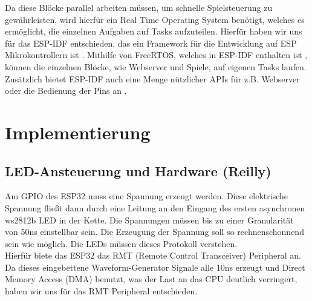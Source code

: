 \documentclass[12pt,a4paper]{article}
\begin{document}
Da diese Blöcke parallel arbeiten müssen, um schnelle Spielsteuerung zu gewährleisten, wird hierfür ein Real Time Operating System benötigt, welches es ermöglicht, die einzelnen Aufgaben auf Tasks aufzuteilen. Hierfür haben wir uns für das ESP-IDF entschieden, das ein Framework für die Entwicklung auf ESP Mikrokontrollern ist \cite{ESSPRESSIF:Reference}. Mithilfe von FreeRTOS, welches in ESP-IDF enthalten ist \cite{ESSPRESSIF:Reference}, können die einzelnen Blöcke, wie Webserver und Spiele, auf eigenen Tasks laufen. Zusätzlich bietet ESP-IDF auch eine Menge nützlicher APIs für z.B. Webserver oder die Bedienung der Pins an \cite{ESSPRESSIF:Reference}.
\vspace{1ex}\\
\newpage


\section{Implementierung}

\subsection{LED-Ansteuerung und Hardware (Reilly)} 
Am GPIO des ESP32 muss eine Spannung erzeugt werden. Diese elektrische Spannung fließt dann durch eine Leitung an den Eingang des ersten asynchronen ws2812b LED in der Kette. Die Spannungen müssen bis zu einer Granularität von 50ns einstellbar sein. Die Erzeugung der Spannung soll so rechnenschonnend sein wie möglich. Die LEDs müssen dieses Protokoll verstehen.
\vspace{1ex}\\
Hierfür biete das ESP32 das RMT (Remote Control Transceiver) Peripheral an. Da dieses eingebettene Waveform-Generator Signale alle 10ns erzeugt und Direct Memory Access (DMA) benutzt, was der Last an das CPU deutlich verringert, haben wir uns für das RMT Peripheral entschieden.
\vspace{1ex}\\
\end{document}
